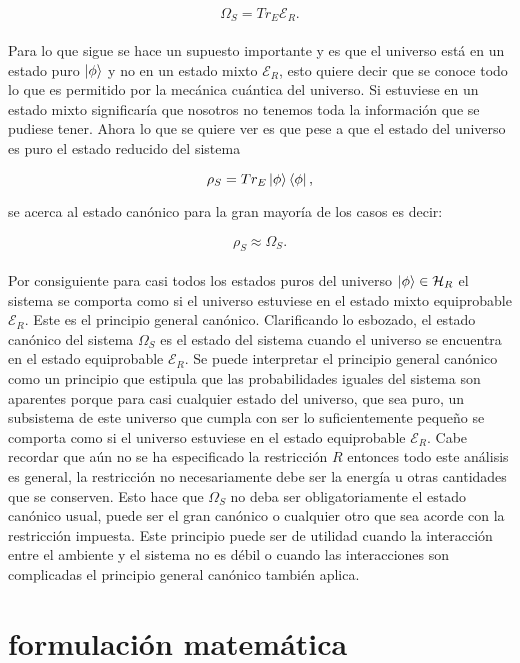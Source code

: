 \begin{equation}
 \Omega_{S} =Tr_{E} \mathcal{E}_{R}.
\end{equation}
\\
Para lo que sigue se hace un supuesto importante  y es que el universo está en un estado puro $\ket{\phi}$ y no en un estado mixto $\mathcal{E}_{R}$, esto quiere decir que se conoce todo lo que es permitido por la mecánica cuántica del universo. Si estuviese en un estado mixto significaría que nosotros no tenemos toda la información que se pudiese tener. Ahora lo que se quiere ver es que  pese a que el estado del universo es puro el estado reducido del sistema

\begin{equation}
\rho_{S}=Tr_{E}\ket{\phi}\bra{\phi},
\end{equation}

se acerca al estado canónico para la gran mayoría de los casos es decir:

\begin{equation}
\rho_{S} \approx \Omega_{S}.
\end{equation}
\\
Por consiguiente para casi todos los estados puros del universo $\ket{\phi} \in \mathcal{H}_{R}$ el sistema se comporta como si el universo estuviese en el estado mixto equiprobable $\mathcal{E}_{R}$. Este  es el principio general canónico. Clarificando lo esbozado, el estado canónico del sistema $\Omega_{S}$ es el estado del sistema cuando el universo se encuentra en el estado equiprobable $\mathcal{E}_{R}$. Se puede interpretar el principio general canónico como un principio que estipula que las probabilidades iguales del sistema son aparentes porque para casi cualquier estado del universo, que sea puro, un subsistema de este universo que cumpla con ser lo suficientemente pequeño se comporta como si el universo estuviese en el estado equiprobable $\mathcal{E}_{R}$. Cabe recordar que aún no se ha especificado la restricción $R$ entonces todo este análisis es general, la restricción no necesariamente debe ser la energía u otras cantidades que se conserven. Esto hace que $\Omega_{S}$ no  deba ser obligatoriamente el estado canónico usual, puede ser el gran canónico o cualquier otro que sea acorde con la restricción impuesta. Este principio puede ser de utilidad cuando la interacción entre el ambiente y el sistema no es débil o cuando las interacciones son complicadas el principio general canónico también aplica.

\section{formulación matemática}

